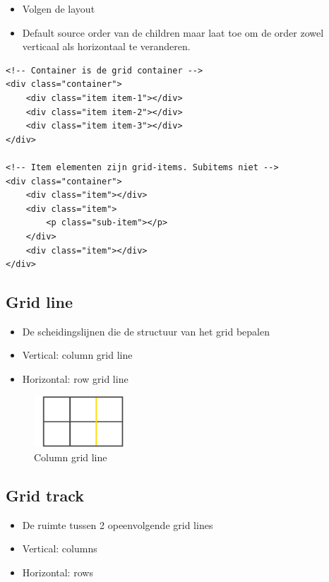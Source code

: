 \documentclass{article}
\begin{document}
\begin{itemize}
    \item Volgen de layout
    \item Default source order van de children maar laat toe om de order zowel verticaal als horizontaal te veranderen.
\end{itemize}

\begin{verbatim}
<!-- Container is de grid container -->
<div class="container">
    <div class="item item-1"></div>
    <div class="item item-2"></div>
    <div class="item item-3"></div>
</div>

<!-- Item elementen zijn grid-items. Subitems niet -->
<div class="container">
    <div class="item"></div>
    <div class="item">
        <p class="sub-item"></p>
    </div>
    <div class="item"></div>
</div>
\end{verbatim}

\subsection{Grid line}

\begin{itemize}
    \item De scheidingslijnen die de structuur van het grid bepalen
    \item Vertical: column grid line
    \item Horizontal: row grid line
\end{itemize}

\begin{figure}[H]
    \centering
    \includegraphics[width=0.3\textwidth]{grid-line-column.png}
    \caption{Column grid line}
\end{figure}

\subsection{Grid track}

\begin{itemize}
    \item De ruimte tussen 2 opeenvolgende grid lines
    \item Vertical: columns
    \item Horizontal: rows
\end{itemize}
\end{document}
